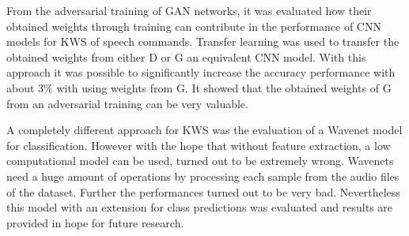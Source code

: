 From the adversarial training of GAN networks, it was evaluated how their obtained weights through training can contribute in the performance of CNN models for KWS of speech commands.
Transfer learning was used to transfer the obtained weights from either D or G an equivalent CNN model.
With this approach it was possible to significantly increase the accuracy performance with about $3\%$ with using weights from G.
It showed that the obtained weights of G from an adversarial training can be very valuable.

A completely different approach for KWS was the evaluation of a Wavenet \cite{Oord2016} model for classification.
However with the hope that without feature extraction, a low computational model can be used, turned out to be extremely wrong.
Wavenets need a huge amount of operations by processing each sample from the audio files of the dataset.
Further the performances turned out to be very bad.
Nevertheless this model with an extension for class predictions was evaluated and results are provided in hope for future research.